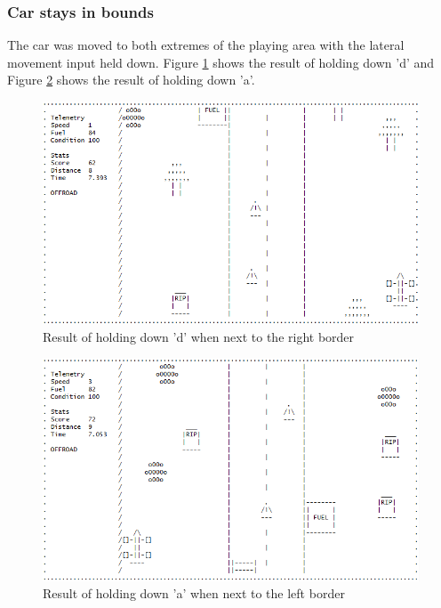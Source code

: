 \documentclass{article}
\begin{document}
\subsubsection*{Car stays in bounds}
The car was moved to both extremes of the playing area with the lateral movement input held down. Figure \ref{fig:car_test_rightborder} shows the result of holding down 'd' and Figure \ref{fig:car_test_leftborder} shows the result of holding down 'a'.
\begin{figure}[!ht]
	\begin{center}
	\includegraphics[width=0.667\paperwidth]{images/car_test_rightborder}
	\caption{Result of holding down 'd' when next to the right border}
	\label{fig:car_test_rightborder} 
	\end{center}
\end{figure}
\begin{figure}[!ht]
	\begin{center}
	\includegraphics[width=0.667\paperwidth]{images/car_test_leftborder}
	\caption{Result of holding down 'a' when next to the left border}
	\label{fig:car_test_leftborder} 
	\end{center}
\end{figure}
\end{document}
